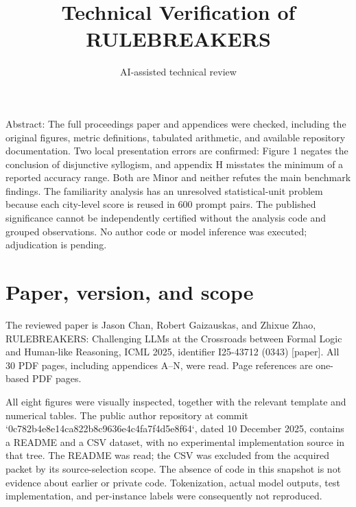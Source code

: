 \documentclass[10pt]{article}
\title{Technical Verification of RULEBREAKERS}
\author{AI-assisted technical review}
\date{}
\begin{document}
\maketitle
Abstract: The full proceedings paper and appendices were checked, including the original figures, metric definitions, tabulated arithmetic, and available repository documentation. Two local presentation errors are confirmed: Figure 1 negates the conclusion of disjunctive syllogism, and appendix H misstates the minimum of a reported accuracy range. Both are Minor and neither refutes the main benchmark findings. The familiarity analysis has an unresolved statistical-unit problem because each city-level score is reused in 600 prompt pairs. The published significance cannot be independently certified without the analysis code and grouped observations. No author code or model inference was executed; adjudication is pending.\par
\section*{Paper, version, and scope}
The reviewed paper is Jason Chan, Robert Gaizauskas, and Zhixue Zhao, RULEBREAKERS: Challenging LLMs at the Crossroads between Formal Logic and Human-like Reasoning, ICML 2025, identifier I25-43712 (0343) [paper]. All 30 PDF pages, including appendices A–N, were read. Page references are one-based PDF pages.\par
All eight figures were visually inspected, together with the relevant template and numerical tables. The public author repository at commit `0c782b4e8e14ca822b8c9636e4c4fa7f4d5e8f64`, dated 10 December 2025, contains a README and a CSV dataset, with no experimental implementation source in that tree. The README was read; the CSV was excluded from the acquired packet by its source-selection scope. The absence of code in this snapshot is not evidence about earlier or private code. Tokenization, actual model outputs, test implementation, and per-instance labels were consequently not reproduced.\par
\end{document}
